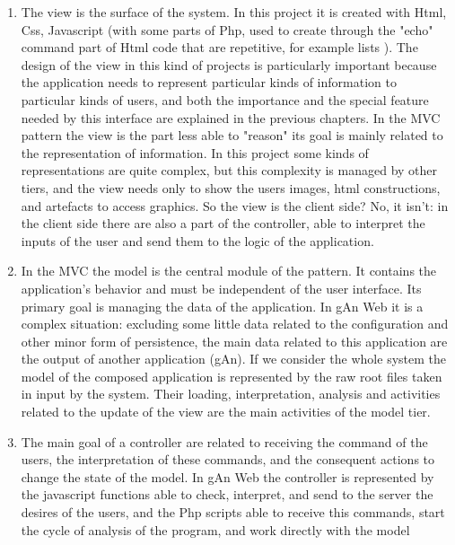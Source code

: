 \begin{enumerate}

\item The view is the surface of the system. In this project it is created with Html, Css, Javascript (with some parts of Php, used to create through the "echo" command part of Html code that are repetitive, for example lists ). The design of the view in this kind of projects is particularly important because the application needs to represent particular kinds of information to particular kinds of users, and both the importance and the special feature needed by this interface are explained in the previous chapters. In the MVC pattern the view is the part less able to "reason" its goal is mainly related to the representation of information. In this project some kinds of representations are quite complex, but this complexity is managed by other tiers, and the view needs only to show the users images, html constructions, and artefacts to access graphics. So the view is the client side? No, it isn't: in the client side there are also a part of the controller, able to interpret the inputs of the user and send them to the logic of the application.

\item In the MVC the model is the central module of the pattern. It contains the application's behavior and must be independent of the user interface. Its primary goal is managing the data of the application. In gAn Web it is a complex situation: excluding some little data related to the configuration and other minor form of persistence, the main data related to this application are the output of another application (gAn). If we consider the whole system the model of the composed application is represented by the raw root files taken in input by the system. Their loading, interpretation, analysis and activities related to the update of the view are the main activities of the model tier.   

\item The main goal of a controller are related to receiving the command of the users, the interpretation of these commands, and the consequent actions to change the state of the model. In gAn Web the controller is represented by the javascript functions able to check, interpret, and send to the server the desires of the users, and the Php scripts able to receive this commands, start the cycle of analysis of the program, and work directly with the model 


\end{enumerate}

